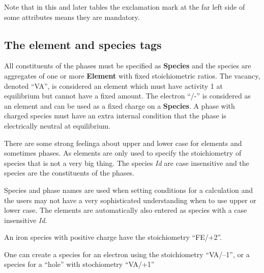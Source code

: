\documentclass{article}
\begin{document}
Note that in this and later tables the exclamation mark at the far
left side of some attributes means they are mandatory.

\subsection{The element and species tags}\label{sec:elements}

All constituents of the phases must be specified as {\bf Species} and
the species are aggregates of one or more {\bf Element} with fixed
stoichiometric ratios.  The vacancy, denoted ``VA'', is considered an
element which must have activity 1 at equilibrium but cannot have a
fixed amount.  The electron ``/-'' is considered as an element and can
be used as a fixed charge on a {\bf Species}.  A phase with charged
species must have an extra internal condition that the phase is
electrically neutral at equilibrium.

There are some strong feelinga about upper and lower case for elements
and sometimes phases.  As elements are only used to specify the
stoichiometry of species that is not a very big thing.  The species
{\em Id} are case insensitive and the species are the constituents of
the phases.

Species and phase names are used when setting conditions for a
calculation and the users may not have a very sophisticated
understanding when to use upper or lower case.  The elements are
automatically also entered as species with a case insensitive {\em Id}.

An iron species with positive charge have the stoichiometry ``FE/+2''.

One can create a species for an electron using the stoichiometry
``VA/--1'', or a species for a ``hole'' with stochiometry ``VA/+1''
\end{document}
